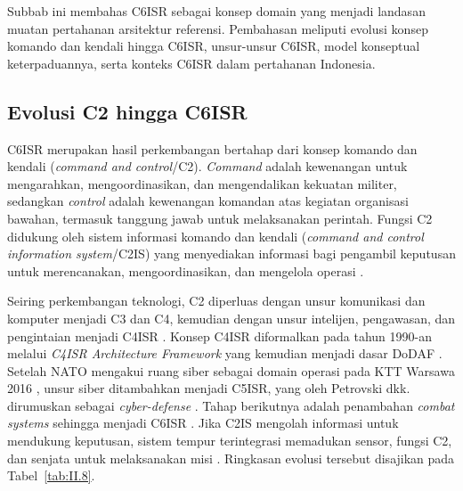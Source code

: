 Subbab ini membahas C6ISR sebagai konsep domain yang menjadi landasan muatan pertahanan arsitektur referensi. Pembahasan meliputi evolusi konsep komando dan kendali hingga C6ISR, unsur-unsur C6ISR, model konseptual keterpaduannya, serta konteks C6ISR dalam pertahanan Indonesia.

\subsection{Evolusi C2 hingga C6ISR}
\label{sec:II.7.1}

C6ISR merupakan hasil perkembangan bertahap dari konsep komando dan kendali (\textit{command and control}/C2\label{sk:C2}). \textit{Command} adalah kewenangan untuk mengarahkan, mengoordinasikan, dan mengendalikan kekuatan militer, sedangkan \textit{control} adalah kewenangan komandan atas kegiatan organisasi bawahan, termasuk tanggung jawab untuk melaksanakan perintah. Fungsi C2 didukung oleh sistem informasi komando dan kendali (\textit{command and control information system}/C2IS\label{sk:C2IS}) yang menyediakan informasi bagi pengambil keputusan untuk merencanakan, mengoordinasikan, dan mengelola operasi \cite{Todorovic2025}.

Seiring perkembangan teknologi, C2 diperluas dengan unsur komunikasi dan komputer menjadi C3 dan C4, kemudian dengan unsur intelijen, pengawasan, dan pengintaian menjadi C4ISR \cite{Petrovski2023,Todorovic2025}. Konsep C4ISR diformalkan pada tahun 1990-an melalui \textit{C4ISR Architecture Framework} yang kemudian menjadi dasar DoDAF \cite{DoDAF2010v202}. Setelah NATO mengakui ruang siber sebagai domain operasi pada KTT Warsawa 2016 \cite{NATO2016Warsaw}, unsur siber ditambahkan menjadi C5ISR, yang oleh Petrovski dkk. dirumuskan sebagai \textit{cyber-defense} \cite{Petrovski2023}. Tahap berikutnya adalah penambahan \textit{combat systems} sehingga menjadi C6ISR \cite{Petrovski2023}. Jika C2IS mengolah informasi untuk mendukung keputusan, sistem tempur terintegrasi memadukan sensor, fungsi C2, dan senjata untuk melaksanakan misi \cite{Todorovic2025}. Ringkasan evolusi tersebut disajikan pada Tabel~\ref{tab:II.8}.

